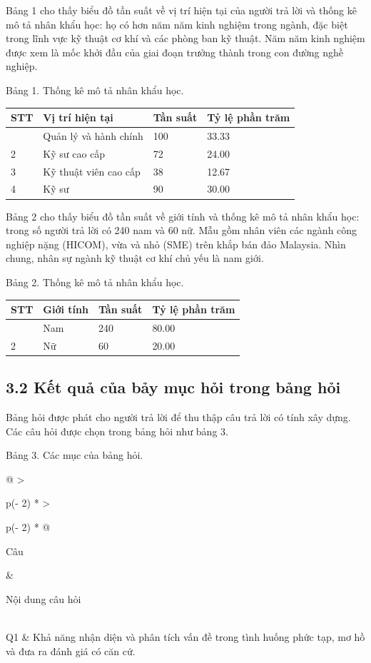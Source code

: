 Bảng 1 cho thấy biểu đồ tần suất về vị trí hiện tại của người trả lời và thống kê mô tả nhân khẩu học: họ có hơn năm năm kinh nghiệm trong ngành, đặc biệt trong lĩnh vực kỹ thuật cơ khí và các phòng ban kỹ thuật. Năm năm kinh nghiệm được xem là mốc khởi đầu của giai đoạn trưởng thành trong con đường nghề nghiệp.

Bảng 1. Thống kê mô tả nhân khẩu học.

{\small
\begin{longtable}[]{@{}llll@{}}
\toprule\noalign{}
STT & Vị trí hiện tại & Tần suất & Tỷ lệ phần trăm \\
\midrule\noalign{}
\endhead
\bottomrule\noalign{}
\endlastfoot
1 & Quản lý và hành chính & 100 & 33.33 \\
2 & Kỹ sư cao cấp & 72 & 24.00 \\
3 & Kỹ thuật viên cao cấp & 38 & 12.67 \\
4 & Kỹ sư & 90 & 30.00 \\
\end{longtable}
}

Bảng 2 cho thấy biểu đồ tần suất về giới tính và thống kê mô tả nhân khẩu học: trong số người trả lời có 240 nam và 60 nữ. Mẫu gồm nhân viên các ngành công nghiệp nặng (HICOM), vừa và nhỏ (SME) trên khắp bán đảo Malaysia. Nhìn chung, nhân sự ngành kỹ thuật cơ khí chủ yếu là nam giới.

Bảng 2. Thống kê mô tả nhân khẩu học.

{\small
\begin{longtable}[]{@{}llll@{}}
\toprule\noalign{}
STT & Giới tính & Tần suất & Tỷ lệ phần trăm \\
\midrule\noalign{}
\endhead
\bottomrule\noalign{}
\endlastfoot
1 & Nam & 240 & 80.00 \\
2 & Nữ & 60 & 20.00 \\
\end{longtable}
}

\subsection{3.2 Kết quả của bảy mục hỏi trong bảng hỏi}

Bảng hỏi được phát cho người trả lời để thu thập câu trả lời có tính xây dựng. Các câu hỏi được chọn trong bảng hỏi như bảng 3.

Bảng 3. Các mục của bảng hỏi.

{\small
\begin{longtable}[]{@{}
  >{\raggedright\arraybackslash}p{(\columnwidth - 2\tabcolsep) * }
  >{\raggedright\arraybackslash}p{(\columnwidth - 2\tabcolsep) * }@{}}
\toprule\noalign{}
\begin{minipage}[b]{\linewidth}\raggedright
Câu
\end{minipage} & \begin{minipage}[b]{\linewidth}\raggedright
Nội dung câu hỏi
\end{minipage} \\
\midrule\noalign{}
\endhead
\bottomrule\noalign{}
\endlastfoot
Q1 & Khả năng nhận diện và phân tích vấn đề trong tình huống phức tạp, mơ hồ và đưa ra đánh giá có căn cứ. \\
\end{longtable}
}

